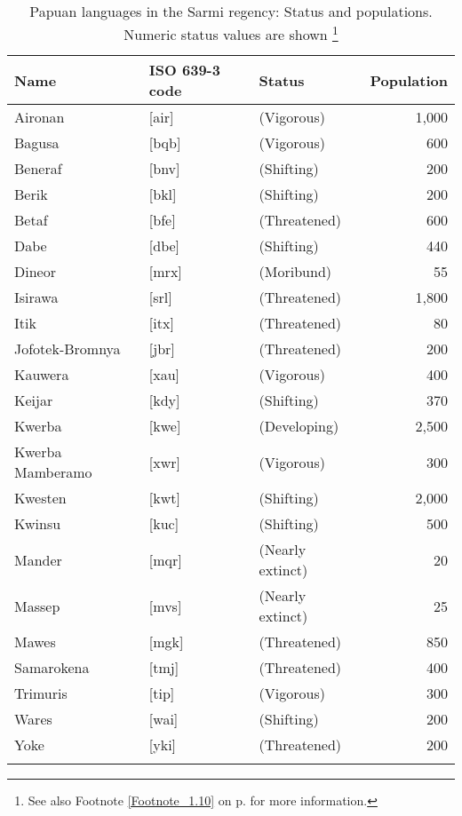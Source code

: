 \renewcommand{\ili}[1]{#1\il{#1}} %
\begin{table}[b]
\caption[Papuan languages in the Sarmi regency]{Papuan languages in the Sarmi regency: Status and populations.\\  Numeric status values are shown 
\footnote{See also Footnote \ref{Footnote_1.10} on p. \pageref{Footnote_1.10} for more information.}
}\label{Table_1.1}


\begin{tabular}{lllr}
\lsptoprule
 Name & ISO 639-3 code & Status & \multicolumn{1}{r}{Population}\\
\midrule

Aironan & [air] & (Vigorous) &  1,000\\
\ili{Bagusa} & [bqb] & (Vigorous) &  600\\
\ili{Beneraf} & [bnv] & (Shifting) &  200\\
\ili{Berik} & [bkl] &  (Shifting) &  200\\
\ili{Betaf} & [bfe] &  (Threatened) &  600\\
\ili{Dabe} & [dbe] & (Shifting) &  440\\
\ili{Dineor} & [mrx] & (Moribund) &  55\\
\ili{Isirawa} & [srl] & (Threatened) &  1,800\\
\ili{Itik} & [itx] & (Threatened) &  80\\
\ili{Jofotek-Bromnya} & [jbr] & (Threatened) &  200\\
\ili{Kauwera} & [xau] & (Vigorous) &  400\\
\ili{Keijar} & [kdy] & (Shifting) &  370\\
\ili{Kwerba} & [kwe] & (Developing) &  2,500\\
\ili{Kwerba} Mamberamo & [xwr] & (Vigorous) &  300\\
\ili{Kwesten} & [kwt] & (Shifting) &  2,000\\
\ili{Kwinsu} & [kuc] & (Shifting) &  500\\
\ili{Mander} & [mqr] & (Nearly extinct) &  20\\
\ili{Massep} & [mvs] &  (Nearly extinct) &  25\\
\ili{Mawes} & [mgk] & (Threatened) &  850\\
\ili{Samarokena} & [tmj] & (Threatened) &  400\\
\ili{Trimuris} & [tip] & (Vigorous) &  300\\
\ili{Wares} & [wai] & (Shifting) &  200\\
\ili{Yoke} & [yki] & (Threatened) &  200\\
\lspbottomrule
\end{tabular} 
\end{table}

